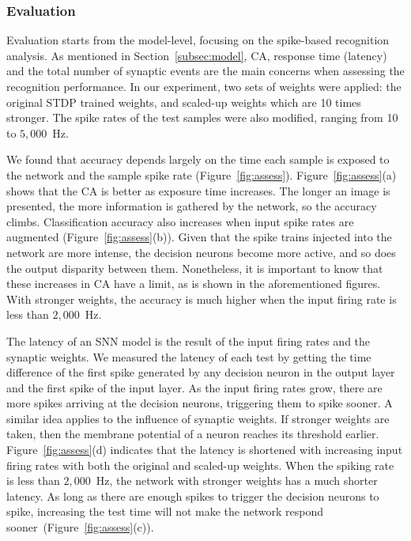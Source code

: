 \subsubsection{Evaluation}
Evaluation starts from the model-level, focusing on the spike-based recognition analysis.
As mentioned in Section~\ref{subsec:model}, CA, response time (latency) and the total number of synaptic events are the main concerns when assessing the recognition performance.
In our experiment, two sets of weights were applied: the original STDP trained weights, and scaled-up weights which are 10 times stronger.
The spike rates of the test samples were also modified, ranging from 10 to $5,000$~Hz.

We found that accuracy depends largely on the time each sample is exposed to the network and the sample spike rate (Figure~\ref{fig:assess}).
Figure~\ref{fig:assess}(a) shows that the CA is better as exposure time increases. The longer an image is presented, the more information is gathered by the network, so the accuracy climbs.
Classification accuracy also increases when input spike rates are augmented (Figure~\ref{fig:assess}(b)).
Given that the spike trains injected into the network are more intense, the decision neurons become more active, and so does the output disparity between them.
Nonetheless, it is important to know that these increases in CA have a limit, as is shown in the aforementioned figures.
With stronger weights, the accuracy is much higher when the input firing rate is less than $2,000$~Hz.


The latency of an SNN model is the result of the input firing rates and the synaptic weights.
We measured the latency of each test by getting the time difference of the first spike generated by any decision neuron in the output layer and the first spike of the input layer.
As the input firing rates grow, there are more spikes arriving at the decision neurons, triggering them to spike sooner.
A similar idea applies to the influence of synaptic weights.
If stronger weights are taken, then the membrane potential of a neuron reaches its threshold earlier.
Figure~\ref{fig:assess}(d) indicates that the latency is shortened with increasing input firing rates with both the original and scaled-up weights.
When the spiking rate is less than $2,000$~Hz, the network with stronger weights has a much shorter latency.
As long as there are enough spikes to trigger the decision neurons to spike, increasing the test time will not make the network respond sooner~(Figure~\ref{fig:assess}(c)).

